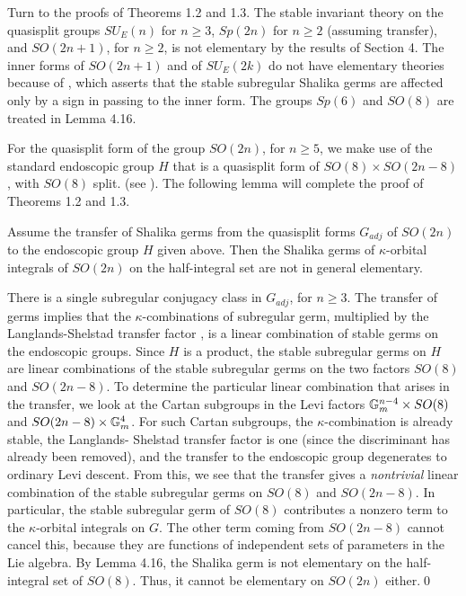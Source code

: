 Turn to the proofs of
Theorems 1.2 and 1.3.  The stable invariant theory on the quasisplit groups
$SU_E(n)$ for $n\ge 3$, $Sp(2n)$ for $n\ge 2$ (assuming transfer), 
and $SO(2n+1)$, for $n\ge 2$,  is not
elementary by the results of Section 4.  
The inner forms of $SO(2n+1)$
and of $SU_E(2k)$ do not have elementary theories because of 
\cite{H3,VII.4.1}, 
which asserts that the stable
subregular Shalika germs are affected
only by a sign in passing to the inner form.  The groups
 $Sp(6)$ and $SO(8)$ are treated in Lemma 4.16.

For the quasisplit form of the group $SO(2n)$, 
for $n\ge 5$, we make use of the 
standard endoscopic group $H$ that is a quasisplit
form of $SO(8)\times SO(2n-8)$, with $SO(8)$ split.
(see \cite{H5,VII.1.4}).
  The following
lemma will complete the proof of Theorems 1.2 and 1.3.

  Assume the transfer of Shalika germs from
the quasisplit forms $G_{adj}$ of 
$SO(2n)$ to the endoscopic group $H$ given above.  Then the
Shalika germs of $\kappa$-orbital integrals of $SO(2n)$
on the half-integral set are not in general elementary.
\endproclaim

There is a single subregular conjugacy class in $G_{adj}$, for $n\ge 3$.
The transfer of germs implies that the 
$\kappa$-combinations of subregular germ, multiplied
by the Langlands-Shelstad transfer factor \cite{LS},  is a linear combination
of stable germs on the endoscopic groups.  
Since $H$ is a product, the stable subregular germs on $H$
are linear combinations of the stable subregular
germs on the two factors $SO(8)$ and $SO(2n-8)$.  To
determine the particular linear combination that arises
in the transfer, we look at the Cartan subgroups in
the Levi factors ${\Bbb G}_m^{n-4}\times SO(8)$ and
$SO(2n-8)\times {\Bbb G}_m^4$.  For such Cartan subgroups,
the $\kappa$-combination is already stable, the Langlands-
Shelstad transfer factor is one (since the discriminant
has already been removed), and the transfer to the
endoscopic group degenerates to ordinary Levi descent.
From this, we see that the transfer gives a {\it nontrivial\/}
linear combination of the stable subregular germs
on $SO(8)$ and $SO(2n-8)$.  In particular, the stable
subregular germ of $SO(8)$ contributes a nonzero term
to the $\kappa$-orbital integrals on $G$.  The other
term coming from $SO(2n-8)$ cannot cancel this, because
they are functions of independent sets of parameters
in the Lie algebra.
By Lemma 4.16,  
the Shalika germ is not elementary on the
half-integral set of $SO(8)$.  Thus, it
cannot be elementary on $SO(2n)$ either.\qed\enddemo

